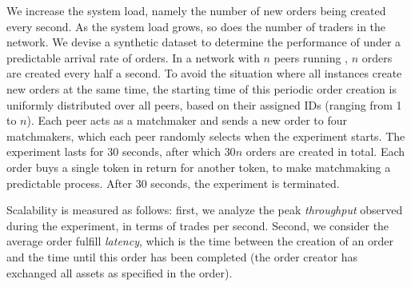 We increase the system load, namely the number of new orders being created every second.
As the system load grows, so does the number of traders in the network.
We devise a synthetic dataset to determine the performance of \ModelName{} under a predictable arrival rate of orders.
In a network with $ n $ peers running \ModelName{}, $ n $ orders are created every half a second.
To avoid the situation where all instances create new orders at the same time, the starting time of this periodic order creation is uniformly distributed over all peers, based on their assigned IDs (ranging from 1 to $ n $).
Each peer acts as a matchmaker and sends a new order to four matchmakers, which each peer randomly selects when the experiment starts.
The experiment lasts for 30 seconds, after which $ 30n $ orders are created in total.
Each order buys a single token in return for another token, to make matchmaking a predictable process.
After 30 seconds, the experiment is terminated.

Scalability is measured as follows:
first, we analyze the peak \emph{throughput} observed during the experiment, in terms of trades per second.
Second, we consider the average order fulfill \emph{latency}, which is the time between the creation of an order and the time until this order has been completed (the order creator has exchanged all assets as specified in the order).

